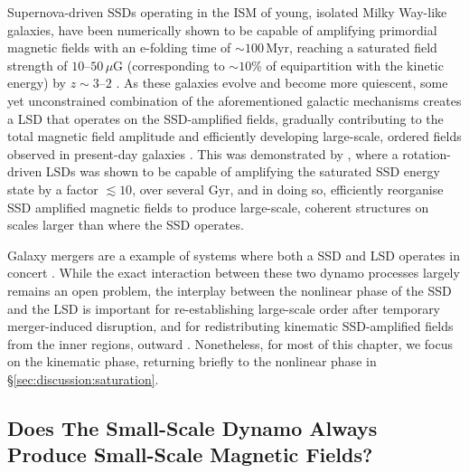 Supernova-driven SSDs operating in the ISM of young, isolated Milky Way-like galaxies, have been numerically shown to be capable of amplifying primordial magnetic fields with an e-folding time of $\sim 100\,\mathrm{Myr}$, reaching a saturated field strength of $10$--$50 \,\mu\mathrm{G}$ (corresponding to $\sim 10\%$ of equipartition with the kinetic energy) by $z \sim 3$--$2$ \citep{pakmor2017magnetic, rieder2016dynamo1, rieder2017dynamo2, steinwandel2023towards, Muni2024_seed_field_to_dynamo}. As these galaxies evolve and become more quiescent, some yet unconstrained combination of the aforementioned galactic mechanisms creates a LSD that operates on the SSD-amplified fields, gradually contributing to the total magnetic field amplitude and efficiently developing large-scale, ordered fields observed in present-day galaxies \citep{rieder2017dynamo2, gent2023transition, brandenburg2023galactic}. This was demonstrated by \citet{gent2023transition}, where a rotation-driven LSDs was shown to be capable of amplifying the saturated SSD energy state by a factor $\lesssim 10$, over several $\mathrm{Gyr}$, and in doing so, efficiently reorganise SSD amplified magnetic fields to produce large-scale, coherent structures on scales larger than where the SSD operates.

Galaxy mergers are a example of systems where both a SSD and LSD operates in concert \citep{berlok2019impact, pfrommer2022simulating}. While the exact interaction between these two dynamo processes largely remains an open problem, the interplay between the nonlinear phase of the SSD and the LSD is important for re-establishing large-scale order after temporary merger-induced disruption, and for redistributing kinematic SSD-amplified fields from the inner regions, outward \citep{whittingham2021impact, whittingham2023impact}. Nonetheless, for most of this chapter, we focus on the kinematic phase, returning briefly to the nonlinear phase in \S\ref{sec:discussion:saturation}.

\subsection{Does The Small-Scale Dynamo Always Produce Small-Scale Magnetic Fields?}

